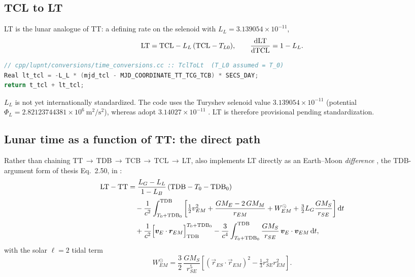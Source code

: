 \subsection{TCL to LT}

LT is the lunar analogue of TT: a defining rate on the selenoid
\citep[Eqs.~2.48--2.49]{iiyama2026thesis} with
$L_L = 3.139054\times10^{-11}$,
%
\begin{equation}
\label{eq:tc-lt}
  \mathrm{LT} = \mathrm{TCL} - L_L\,(\mathrm{TCL} - T_{L0}),
  \qquad
  \frac{\mathrm{d} \mathrm{LT}}{\mathrm{d} \mathrm{TCL}} = 1 - L_L .
\end{equation}

\begin{lstlisting}[language=cpp]
// cpp/lupnt/conversions/time_conversions.cc :: TclToLt  (T_L0 assumed = T_0)
Real lt_tcl = -L_L * (mjd_tcl - MJD_COORDINATE_TT_TCG_TCB) * SECS_DAY;
return t_tcl + lt_tcl;
\end{lstlisting}

\begin{lupntwarning}
$L_L$ is not yet internationally standardized. The code uses the Turyshev
selenoid value $3.139054\times10^{-11}$ (potential
$\Phi_L = 2.82123744381\times10^{6}\ \si{\meter\squared\per\second\squared}$),
whereas \citet{kopeikin2024lunar} adopt $3.14027\times10^{-11}$
\citep[Ch.~2.3.5]{iiyama2026thesis}. LT is therefore provisional pending
standardization.
\end{lupntwarning}

\subsection{Lunar time as a function of TT: the direct path}
\label{sec:tc-lt-direct}

Rather than chaining TT\,$\to$\,TDB\,$\to$\,TCB\,$\to$\,TCL\,$\to$\,LT,
\lupnt{} also implements LT directly as an Earth--Moon \emph{difference}
\citep[Eq.~57]{turyshev2026cislunar}, the TDB-argument form of thesis
Eq.~2.50, in :
%
\begin{equation}
\label{eq:tc-ltmtt}
\begin{aligned}
  \mathrm{LT} - \mathrm{TT}
    &= \frac{L_G - L_L}{1 - L_B}\left(\mathrm{TDB} - T_0 - \mathrm{TDB}_0\right) \\[2pt]
    &\quad - \frac{1}{c^{2}} \int_{T_0 + \mathrm{TDB}_0}^{\mathrm{TDB}}
       \left[ \tfrac{1}{2} v_{EM}^{2}
            + \frac{GM_E - 2\,GM_M}{r_{EM}}
            + W^{\odot}_{EM}
            + \tfrac{3}{2} L_G \frac{GM_S}{r_{SE}} \right] \mathrm{d} t \\[2pt]
    &\quad + \frac{1}{c^{2}}
       \Bigl[ \bm{v}_E \cdot \bm{r}_{EM} \Bigr]_{\mathrm{TDB}}^{T_0 + \mathrm{TDB}_0}
     - \frac{3}{c^{4}} \int_{T_0 + \mathrm{TDB}_0}^{\mathrm{TDB}}
       \frac{GM_S}{r_{SE}}\, \bm{v}_E \cdot \bm{v}_{EM} \,\mathrm{d} t,
\end{aligned}
\end{equation}
%
with the solar $\ell = 2$ tidal term
%
\begin{equation}
\label{eq:tc-tidal}
  W^{\odot}_{EM} = \frac{3}{2}\,\frac{GM_S}{r_{SE}^{5}}
    \left[ (\vec{r}_{ES} \cdot \vec{r}_{EM})^{2}
         - \tfrac{1}{3} r_{SE}^{2} r_{EM}^{2} \right].
\end{equation}

